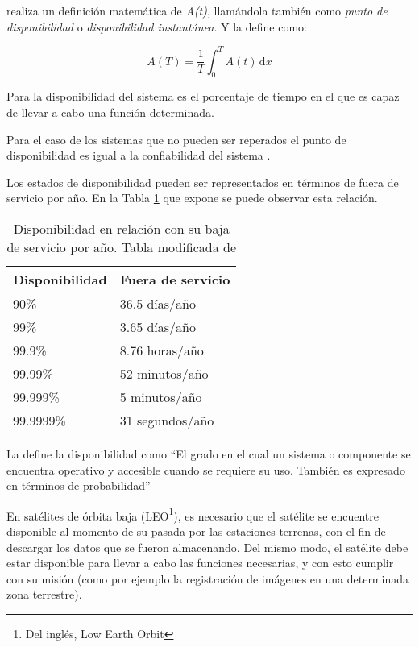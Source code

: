\cite{FTDesign} realiza un definición matemática de \textit{A(t)}, llamándola también como
\textit{punto de disponibilidad} o \textit{disponibilidad instantánea}. Y la define como:

$$A(T) = \frac{1}{T} \int_0^T \! A(t) \, \mathrm{d}x $$

Para \cite{Hanmer07} la disponibilidad del sistema es el porcentaje de tiempo en el que es capaz de
llevar a cabo una función determinada.

Para el caso de los sistemas que no pueden ser reperados el punto de disponibilidad es igual a la
confiabilidad del sistema \citep{FTDesign}.

Los estados de disponibilidad pueden ser representados en términos de fuera de servicio por año. En
la Tabla \ref{table:avalVSdowntime} que expone \cite{FTDesign} se puede observar esta relación.

\begin{table}[h]
  \centering
  \begin{tabular}{l|l}
    \hline
    Disponibilidad & Fuera de servicio \\ \hline
    90\%           & 36.5 días/año     \\
    99\%           & 3.65 días/año     \\
    99.9\%         & 8.76 horas/año    \\
    99.99\%        & 52 minutos/año    \\
    99.999\%       & 5 minutos/año     \\
    99.9999\%      & 31 segundos/año   \\ \hline
  \end{tabular}
  \caption{Disponibilidad en relación con su baja de servicio por año. Tabla
modificada de \protect\cite{FTDesign}}
  \label{table:avalVSdowntime}
\end{table}

La \cite{IEEE610.12} define la disponibilidad como ``El grado en el cual un sistema o
componente se encuentra operativo y accesible cuando se requiere su uso. También es expresado en
términos de probabilidad''

En satélites de órbita baja (LEO\footnote{Del inglés, Low Earth Orbit}), es necesario que el
satélite se encuentre disponible al momento de su pasada por las estaciones terrenas, con el fin de 
descargar los datos que se fueron almacenando. Del mismo modo, el satélite debe estar disponible
para llevar a cabo las funciones necesarias, y con esto cumplir con su misión (como por ejemplo la
registración de imágenes en una determinada zona terrestre).

